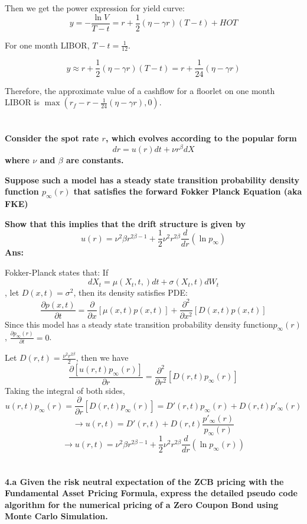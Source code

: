 \documentclass[11pt, notitlepage]{article}
\begin{document}
Then we get the power expression for yield curve:
$$ y = -\frac{\ln V}{T-t} = r +\frac{1}{2}(\eta - \gamma r)(T-t) + HOT$$

For one month LIBOR, $T-t = \frac{1}{12}$.

$$ y \approx r+\frac{1}{2}(\eta - \gamma r)(T-t) = r +\frac{1}{24} (\eta - \gamma r)$$

Therefore, the approximate value of a cashflow for a floorlet on one month LIBOR is $\max(r_f - r -\frac{1}{24}(\eta - \gamma r), 0)$.


\newpage
\section{}
\color{red}
\textbf{Consider the spot rate $r$, which evolves according to the popular form
$$dr = u(r) dt + \nu r^\beta dX$$
where $\nu$ and $\beta$ are constants. }

\textbf{Suppose such a model has a steady state transition probability density function $p_\infty(r)$ that satisfies the forward Fokker Planck Equation (aka FKE)}

\textbf{Show that this implies that the drift structure is given by
$$ u(r) = \nu ^2 \beta r^{2\beta-1} + \frac{1}{2} \nu^2 r^{2\beta} \frac{d}{dr}(\ln p_\infty)$$}
\vspace{5mm}
\color{black}
\textbf {Ans:}

Fokker-Planck states that: If
$$dX_t = \mu(X_t,t,)dt + \sigma(X_t,t)dW_t$$
, let $D(x,t) = \sigma^2$, then its density satisfies PDE:
$$\frac{\partial p(x,t)}{\partial t} = \frac{\partial}{\partial x} [\mu(x,t)p(x,t)] + \frac{\partial^2}{\partial x^2}[D(x,t) p(x,t)]$$
Since this model has a steady state transition probability density function$p_\infty(r)$, $\frac{\partial p_\infty(r)}{\partial t} = 0$.

Let $D(r,t) = \frac{\nu^2 r^{2\beta}}{2}$, then we have
$$ \frac{\partial [u(r,t)p_\infty(r)]}{\partial r} = \frac{\partial^2}{\partial r^2} [D(r,t)p_\infty(r)]$$
Taking the integral of both sides,
$$u(r,t) p_\infty(r) =\frac{\partial}{\partial r} [D(r,t)p_\infty(r)] =  D'(r,t) p_\infty(r) + D(r,t)p'_\infty(r)$$
$$ \to u(r,t) = D'(r,t) + D(r,t) \frac{p'_\infty(r)}{p_\infty(r)}$$
$$ \to u(r,t) = \nu ^2 \beta r^{2\beta-1} + \frac{1}{2} \nu^2 r^{2\beta} \frac{d}{dr}(\ln p_\infty(r))$$


\newpage
\vspace{5mm}
\section{}
\color{red}
\bfseries
4.a Given the risk neutral expectation of the ZCB pricing with the Fundamental Asset Pricing Formula, express the detailed pseudo code algorithm for the numerical pricing of a Zero Coupon Bond using Monte Carlo Simulation.
\mdseries
\end{document}
